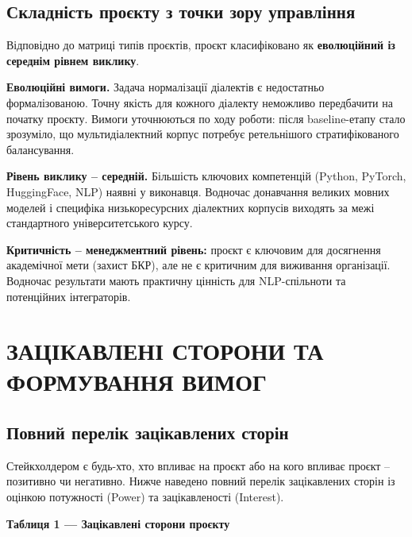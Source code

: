 \documentclass[14pt]{extarticle}
\begin{document}
\subsection{Складність проєкту з точки зору управління}

Відповідно до матриці типів проєктів, проєкт класифіковано як \textbf{еволюційний із середнім рівнем виклику}.

\textbf{Еволюційні вимоги.} Задача нормалізації діалектів є недостатньо формалізованою. Точну якість для кожного діалекту неможливо передбачити на початку проєкту. Вимоги уточнюються по ходу роботи: після baseline-етапу стало зрозуміло, що мульти\-діалектний корпус потребує ретельнішого стратифікованого балансування.

\textbf{Рівень виклику -- середній.} Більшість ключових компетенцій (Python, PyTorch, HuggingFace, NLP) наявні у виконавця. Водночас донавчання великих мовних моделей і специфіка низькоресурсних діалектних корпусів виходять за межі стандартного університетського курсу.

\textbf{Критичність -- менеджментний рівень:} проєкт є ключовим для досягнення академічної мети (захист БКР), але не є критичним для виживання організації. Водночас результати мають практичну цінність для NLP-спільноти та потенційних інтеграторів.

\clearpage

\section{ЗАЦІКАВЛЕНІ СТОРОНИ ТА ФОРМУВАННЯ ВИМОГ}

\subsection{Повний перелік зацікавлених сторін}

Стейкхолдером є будь-хто, хто впливає на проєкт або на кого впливає проєкт -- позитивно чи негативно. Нижче наведено повний перелік зацікавлених сторін із оцінкою потужності (Power) та зацікавленості (Interest).

\vspace{6pt}
\noindent\textbf{Таблиця 1 --- Зацікавлені сторони проєкту}
\end{document}
